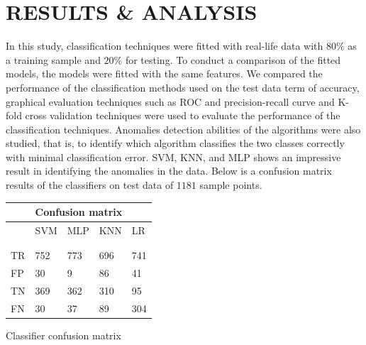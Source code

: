 \documentclass[final,5p,times,twocolumn,authoryear]{elsarticle}
\begin{document}
\section{RESULTS \& ANALYSIS} \label{sec:resu}
In this study, classification techniques were fitted with real-life data with $80\%$ as a training sample and $20\%$ for testing. To conduct a comparison of the fitted models, the models were fitted with the same features. We compared the performance of the classification methods used on the test data term of accuracy, graphical evaluation techniques such as ROC and precision-recall curve and K-fold cross validation techniques were used to evaluate the performance of the classification techniques. Anomalies detection abilities of the algorithms were also studied, that is, to identify which algorithm classifies the two classes correctly with minimal classification error. SVM, KNN, and MLP shows an impressive result in identifying the anomalies in the data. Below is a confusion matrix results of the classifiers on test data of $1181$ sample points.
\begin{center}
	\begin{tabular}{ |p{0.7cm}|p{0.7cm}|p{0.7cm}|p{0.7cm}|p{0.7cm}|} 
		\hline
		\hline
		\multicolumn{5}{c}{\cellcolor{gray!50}Confusion matrix} \\
		\hline
		\hline
		\cline{1-5}
		
		&SVM&MLP&KNN&LR \\
		& && & \\
		& && & \\
		\cline{1-5}
		TR &752&773&696 &741   \\
		\hline
		FP&  30   &9&86&41	\\
		\hline
		TN&369&362	&310&95	\\
		\hline
		FN &30& 37&89&304	\\
		\hline
	\end{tabular}
	\captionsetup{type=table} 
	\caption{Classifier confusion matrix }
	\label{tab4}
\end{center}
\end{document}
